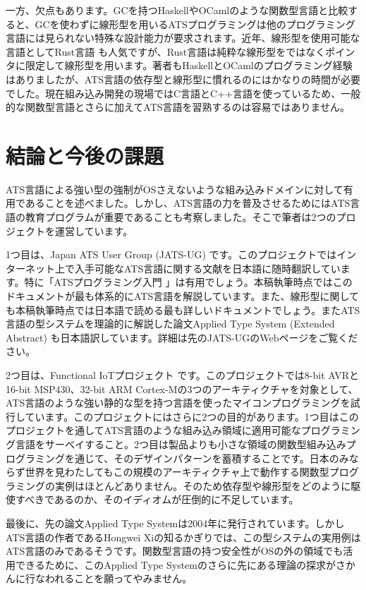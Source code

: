 \documentclass{ipsjprosym}
\begin{document}
一方、欠点もあります。GCを持つHaskellやOCamlのような関数型言語と比較すると、GCを使わずに線形型を用いるATSプログラミングは他のプログラミング言語には見られない特殊な設計能力が要求されます。近年、線形型を使用可能な言語としてRust言語 \cite{rust} も人気ですが、Rust言語は純粋な線形型をではなくポインタに限定して線形型を用います。著者もHaskellとOCamlのプログラミング経験はありましたが、ATS言語の依存型と線形型に慣れるのにはかなりの時間が必要でした。現在組み込み開発の現場ではC言語とC++言語を使っているため、一般的な関数型言語とさらに加えてATS言語を習熟するのは容易ではありません。

\section{結論と今後の課題}

ATS言語による強い型の強制がOSさえないような組み込みドメインに対して有用であることを述べました。しかし、ATS言語の力を普及させるためにはATS言語の教育プログラムが重要であることも考察しました。そこで筆者は2つのプロジェクトを運営しています。

1つ目は、Japan ATS User Group (JATS-UG) \cite{jats-ug} です。このプロジェクトではインターネット上で入手可能なATS言語に関する文献を日本語に随時翻訳しています。特に「ATSプログラミング入門 \cite{INT2PROGINATS-J}」は有用でしょう。本稿執筆時点ではこのドキュメントが最も体系的にATS言語を解説しています。また、線形型に関しても本稿執筆時点では日本語で読める最も詳しいドキュメントでしょう。またATS言語の型システムを理論的に解説した論文Applied Type System (Extended Abstract) \cite{ATStypes03} も日本語訳しています。詳細は先のJATS-UGのWebページをご覧ください。

2つ目は、Functional IoTプロジェクト \cite{fpiot} です。このプロジェクトでは8-bit AVRと16-bit MSP430、32-bit ARM Cortex-Mの3つのアーキティクチャを対象として、ATS言語のような強い静的な型を持つ言語を使ったマイコンプログラミングを試行しています。このプロジェクトにはさらに2つの目的があります。1つ目はこのプロジェクトを通してATS言語のような組み込み領域に適用可能なプログラミング言語をサーベイすること。2つ目は製品よりも小さな領域の関数型組み込みプログラミングを通じて、そのデザインパターンを蓄積することです。日本のみならず世界を見わたしてもこの規模のアーキティクチャ上で動作する関数型プログラミングの実例はほとんどありません。そのため依存型や線形型をどのように駆使すべきであるのか、そのイディオムが圧倒的に不足しています。

最後に、先の論文Applied Type Systemは2004年に発行されています。しかしATS言語の作者であるHongwei Xiの知るかぎりでは、この型システムの実用例はATS言語のみであるそうです。関数型言語の持つ安全性がOSの外の領域でも活用できるために、このApplied Type Systemのさらに先にある理論の探求がさかんに行なわれることを願ってやみません。
\end{document}
